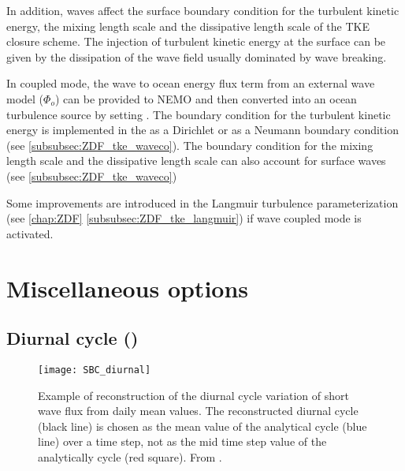 \documentclass[../main/NEMO_manual]{subfiles}
\begin{document}
In addition, waves affect the surface boundary condition for the turbulent kinetic energy, the mixing length scale and the dissipative length scale of the TKE closure scheme.
The injection of turbulent kinetic energy at the surface can be given by the dissipation of the wave field usually dominated by wave breaking.

In coupled mode, the wave to ocean energy flux term from an external wave model ($ \Phi_o $) can be provided to NEMO and then converted into an ocean turbulence source by setting .
The boundary condition for the turbulent kinetic energy is implemented in the  as a Dirichlet or as a Neumann boundary condition (see \autoref{subsubsec:ZDF_tke_waveco}). The boundary condition for the mixing length scale and the dissipative length scale can also account for surface waves (see \autoref{subsubsec:ZDF_tke_waveco})

Some improvements are introduced in the Langmuir turbulence parameterization (see \autoref{chap:ZDF} \autoref{subsubsec:ZDF_tke_langmuir}) if wave coupled mode is activated.

\section{Miscellaneous options}
\label{sec:SBC_misc}

\subsection[Diurnal cycle (\textit{sbcdcy.F90})]{Diurnal cycle (\protect{})}
\label{subsec:SBC_dcy}

\begin{figure}[!t]
  \centering
  \texttt{[image: SBC\_diurnal]}
  \caption[Reconstruction of the diurnal cycle variation of short wave flux]{
    Example of reconstruction of the diurnal cycle variation of short wave flux from
    daily mean values.
    The reconstructed diurnal cycle (black line) is chosen as
    the mean value of the analytical cycle (blue line) over a time step,
    not as the mid time step value of the analytically cycle (red square).
    From \citet{bernie.guilyardi.ea_CD07}.}
  \label{fig:SBC_diurnal}
\end{figure}
\end{document}
